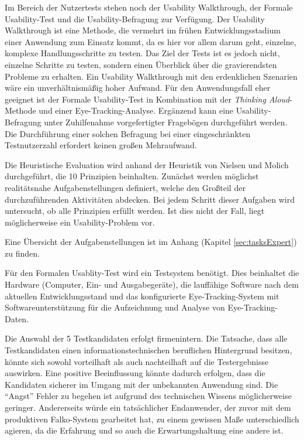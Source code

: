 Im Bereich der Nutzertests stehen noch der Usability Walkthrough, der Formale Usability-Test und die Usability-Befragung zur Verfügung. Der Usability Walkthrough ist eine Methode, die vermehrt im frühen Entwicklungsstadium einer Anwendung zum Einsatz kommt, da es hier vor allem darum geht, einzelne, komplexe Handlungsschritte zu testen. Das Ziel der Tests ist es jedoch nicht, einzelne Schritte zu testen, sondern einen Überblick über die gravierendsten Probleme zu erhalten. Ein Usability Walkthrough mit den erdenklichen Szenarien wäre ein unverhältnismäßig hoher Aufwand. Für den Anwendungsfall eher geeignet ist der Formale Usability-Test in Kombination mit der \textit{Thinking Aloud}-Methode und einer Eye-Tracking-Analyse. Ergänzend kann eine Usability-Befragung unter Zuhilfenahme vorgefertigter Fragebögen durchgeführt werden. Die Durchführung einer solchen Befragung bei einer eingeschränkten Testnutzerzahl erfordert keinen großen Mehraufwand.\par
{}
Die Heuristische Evaluation wird anhand der Heuristik von Nielsen und Molich durchgeführt, die 10 Prinzipien beinhalten.\cite[S. 233]{Ullenboom2012} Zunächst werden möglichst realitätsnahe Aufgabenstellungen definiert, welche den Großteil der durchzuführenden Aktivitäten abdecken. Bei jedem Schritt dieser Aufgaben wird untersucht, ob alle Prinzipien erfüllt werden. Ist dies nicht der Fall, liegt möglicherweise ein Usability-Problem vor.\par
Eine Übersicht der Aufgabenstellungen ist im Anhang (Kapitel \ref{sec:tasksExpert}) zu finden.\par
{}
Für den Formalen Usablity-Test wird ein Testsystem benötigt. Dies beinhaltet die Hardware (Computer, Ein- und Ausgabegeräte), die lauffähige Software nach dem aktuellen Entwicklungsstand und das konfigurierte Eye-Tracking-System mit Softwareunterstützung für die Aufzeichnung und Analyse von Eye-Tracking-Daten.%
\par
Die Auswahl der 5 Testkandidaten erfolgt firmenintern. Die Tatsache, dass alle Testkandidaten einen informationstechnischen beruflichen Hintergrund besitzen, könnte sich sowohl vorteilhaft als auch nachteilhaft auf die Testergebnisse auswirken. Eine positive Beeinflussung könnte dadurch erfolgen, dass die Kandidaten sicherer im Umgang mit der unbekannten Anwendung sind. Die \enquote{Angst} Fehler zu begehen ist aufgrund des technischen Wissens möglicherweise geringer. Andererseits würde ein tatsächlicher Endanwender, der zuvor mit dem produktiven Falko-System gearbeitet hat, zu einem gewissen Maße unterschiedlich agieren, da die Erfahrung und so auch die Erwartungshaltung eine andere ist.\par
